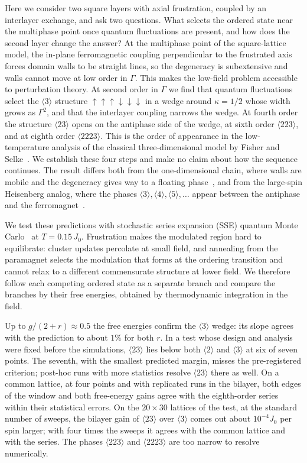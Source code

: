 \documentclass[
 aps,prb,
 twocolumn,
 superscriptaddress,
 longbibliography,
 nofootinbib,
 floatfix
]{revtex4-2}
\newcommand{\up}{\uparrow}
\newcommand{\dn}{\downarrow}
\begin{document}
Here we consider two square layers with axial frustration, coupled by an interlayer exchange, and
ask two questions. What selects the ordered state near the multiphase point once quantum
fluctuations are present, and how does the second layer change the answer? At the multiphase point
of the square-lattice model, the in-plane ferromagnetic coupling perpendicular to the frustrated
axis forces domain walls to be straight lines, so the degeneracy is subextensive and walls cannot
move at low order in $\Gamma$. This makes the low-field problem accessible to perturbation theory.
At second order in $\Gamma$ we find that quantum fluctuations select the $\langle3\rangle$ structure
$\up\up\up\dn\dn\dn$ in a wedge around $\kappa=1/2$ whose width grows as $\Gamma^2$, and that the
interlayer coupling narrows the wedge. At fourth order the structure $\langle23\rangle$ opens on the
antiphase side of the wedge, at sixth order $\langle223\rangle$, and at eighth order $\langle2223\rangle$.
This is the order of appearance in the low-temperature analysis of the classical three-dimensional model by
Fisher and Selke~\cite{fisher1980infinitely,fisher1981low}. We establish these four steps and make no claim
about how the sequence continues. The result differs both from the one-dimensional chain, where
walls are mobile and the degeneracy gives way to a floating phase~\cite{rieger1996one}, and from the
large-spin Heisenberg analog, where the phases $\langle3\rangle,\langle4\rangle,\langle5\rangle,\dots$ appear
between the antiphase and the ferromagnet~\cite{harris1995quantum,harris1995quantumb}.

We test these predictions with stochastic series expansion (SSE) quantum Monte
Carlo~\cite{sandvik1999stochastic,sandvik2003stochastic,sandvik2010computational} at $T=0.15\,J_0$.
Frustration makes the modulated region hard to equilibrate: cluster updates percolate at small
field, and annealing from the paramagnet selects the modulation that forms at the ordering
transition and cannot relax to a different commensurate structure at lower field. We therefore
follow each competing ordered state as a separate branch and compare the branches by their free
energies, obtained by thermodynamic integration in the field.

Up to $g/(2+r)\approx0.5$ the free energies confirm the $\langle3\rangle$ wedge: its slope agrees with the prediction
to about $1\%$ for both $r$. In a test whose design
and analysis were fixed before the simulations, $\langle23\rangle$ lies below both $\langle2\rangle$ and
$\langle3\rangle$ at six of seven points. The seventh, with the smallest predicted margin, misses the
pre-registered criterion; post-hoc runs with more statistics resolve $\langle23\rangle$ there as well. On a common
lattice, at four points and with replicated runs in the bilayer, both edges of the window and both free-energy gains
agree with the eighth-order series within their statistical errors. On the $20\times30$ lattices of the test, at the standard number of sweeps, the bilayer gain of $\langle23\rangle$ over
$\langle3\rangle$ comes out about $10^{-4}J_0$ per spin larger; with four times the sweeps it agrees with the common
lattice and with the series. The phases
$\langle223\rangle$ and $\langle2223\rangle$ are too narrow to resolve numerically.
\end{document}
